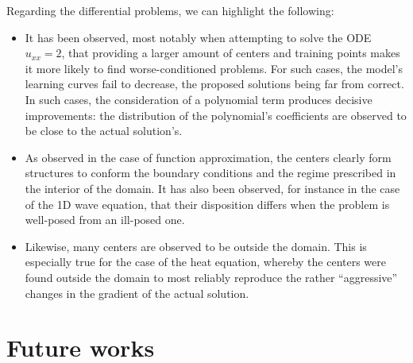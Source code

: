 \documentclass[12pt]{report} %
\begin{document}
\begin{itemize}
Regarding the differential problems, we can highlight the following:

\begin{itemize}
  \item It has been observed, most notably when attempting to solve the ODE $u_{x x}=2$, that providing a larger amount of centers and training points makes it more likely to find worse-conditioned problems. For such cases, the model's learning curves fail to decrease, the proposed solutions being far from correct. In such cases, the consideration of a polynomial term produces decisive improvements: the distribution of the polynomial's coefficients are observed to be close to the actual solution's.
  \item As observed in the case of function approximation, the centers clearly form structures to conform the boundary conditions and the regime prescribed in the interior of the domain. It has also been observed, for instance in the case of the 1D wave equation, that their disposition differs when the problem is well-posed from an ill-posed one.
  \item Likewise, many centers are observed to be outside the domain. This is especially true for the case of the heat equation, whereby the centers were found outside the domain to most reliably reproduce the rather ``aggressive'' changes in the gradient of the actual solution.
\end{itemize}

\end{itemize}

\section*{Future works}
\end{document}
